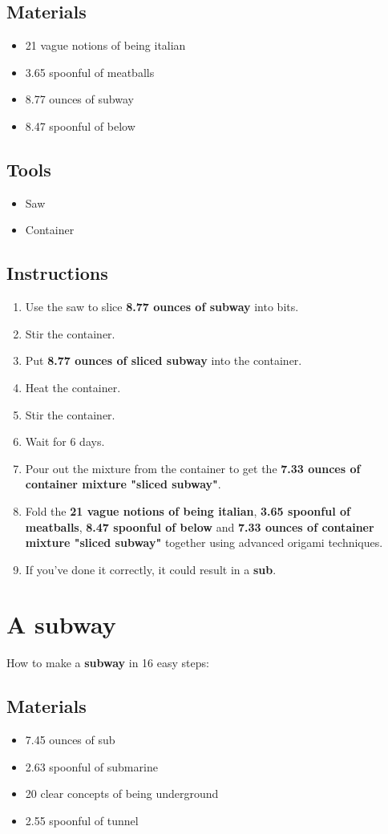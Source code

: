 \documentclass{article}
\begin{document}
\subsection{Materials}\begin{itemize}
\item 
21 vague notions of being italian
\item 
3.65 spoonful of meatballs
\item 
8.77 ounces of subway
\item 
8.47 spoonful of below
\end{itemize}
\subsection{Tools}\begin{itemize}
\item 
Saw
\item 
Container
\end{itemize}
\subsection{Instructions}\begin{enumerate}
\item 
Use the saw to slice \textbf{8.77 ounces of subway} into bits.
\item 
Stir the container.
\item 
Put \textbf{8.77 ounces of sliced subway} into the container.
\item 
Heat the container.
\item 
Stir the container.
\item 
Wait for 6 days.
\item 
Pour out the mixture from the container to get the \textbf{7.33 ounces of container mixture "sliced subway"}.
\item 
Fold the \textbf{21 vague notions of being italian}, \textbf{3.65 spoonful of meatballs}, \textbf{8.47 spoonful of below} and \textbf{7.33 ounces of container mixture "sliced subway"} together using advanced origami techniques.
\item 
If you've done it correctly, it could result in a \textbf{sub}.
\end{enumerate}
\newpage
\section{A subway}How to make a \textbf{subway} in 16 easy steps:

\subsection{Materials}\begin{itemize}
\item 
7.45 ounces of sub
\item 
2.63 spoonful of submarine
\item 
20 clear concepts of being underground
\item 
2.55 spoonful of tunnel
\end{itemize}
\end{document}
